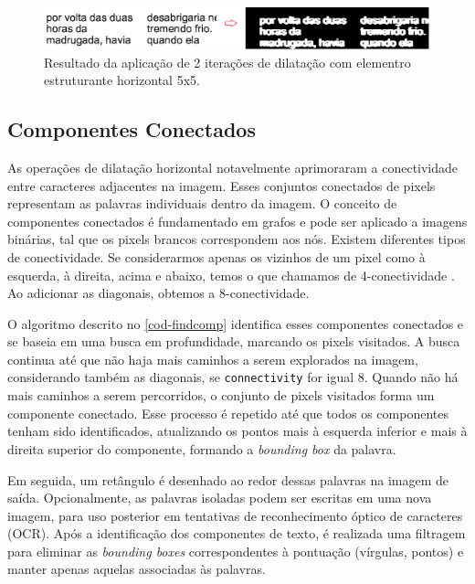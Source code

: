 \documentclass[english, 
               brazil, 
               bsc] %
               {dcomp-abntex2}
\begin{document}
\begin{figure}[htb]
        \caption{\label{horz} \small Resultado da aplicação de 2 iterações de dilatação com elementro estruturante horizontal 5x5. }
        \begin{center}
            \includegraphics[scale=0.15]{./images/horizontal_5x5_aplicacao.png}
        \end{center}
\end{figure}






\subsection{Componentes Conectados} \label{sec-comp}



As operações de dilatação horizontal notavelmente aprimoraram a conectividade entre caracteres adjacentes na imagem. Esses conjuntos conectados de pixels representam as palavras individuais dentro da imagem. O conceito de componentes conectados é fundamentado em grafos e pode ser aplicado a imagens binárias, tal que os pixels brancos correspondem aos nós. Existem diferentes tipos de conectividade. Se considerarmos apenas os vizinhos de um pixel como à esquerda, à direita, acima e abaixo, temos o que chamamos de 4-conectividade \cite[2.5.2 \textit{Adjacency, Connectivity, Regions, and Boundaries}]{gonzalez2008digital}. Ao adicionar as diagonais, obtemos a 8-conectividade.


O algoritmo descrito no \autoref{cod-findcomp} identifica esses componentes conectados e se baseia em uma busca em profundidade, marcando os pixels visitados. A busca continua até que não haja mais caminhos a serem explorados na imagem, considerando também as diagonais, se \texttt{connectivity} for igual 8. Quando não há mais caminhos a serem percorridos, o conjunto de pixels visitados forma um componente conectado. Esse processo é repetido até que todos os componentes tenham sido identificados, atualizando os pontos mais à esquerda inferior e mais à direita superior do componente, formando a \textit{bounding box} da palavra.


Em seguida, um retângulo é desenhado ao redor dessas palavras na imagem de saída. Opcionalmente, as palavras isoladas podem ser escritas em uma nova imagem, para uso posterior em tentativas de reconhecimento óptico de caracteres (OCR). Após a identificação dos componentes de texto, é realizada uma filtragem para eliminar as \textit{bounding boxes} correspondentes à pontuação (vírgulas, pontos) e manter apenas aquelas associadas às palavras.
\end{document}
